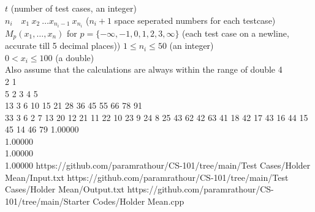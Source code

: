 \begin{testcasesMore}
	{$t$ \hfill(number of test cases, an integer)\\
	$n_i\quad x_1\ x_2\ \ldots x_{n_i-1}\ x_{n_i}$ \hfill($n_i+1$ space seperated numbers for each testcase)}
	{$M_{p}(x_{1},\dots ,x_{n})$ for $p=\{-\infty, -1, 0, 1, 2, 3, \infty\}$ \hfill{(each test case on a newline, accurate till 5 decimal places))}}
	{$1 \leq n_i \leq 50$ \hfill{(an integer)}\\
	$0 < x_i \leq 100$ \hfill{(a double)}\\
	Also assume that the calculations are always within the range of double}
	{4\\2 1\\5 2 3 4 5\\13 3 6 10 15 21 28 36 45 55 66 78 91\\33 3 6 2 7 13 20 12 21 11 22 10 23 9 24 8 25 43 62 42 63 41 18 42 17 43 16 44 15 45 14 46 79}
	{1.00000\\1.00000\\1.00000\\1.00000}
	{https://github.com/paramrathour/CS-101/tree/main/Test Cases/Holder Mean/Input.txt}
	{https://github.com/paramrathour/CS-101/tree/main/Test Cases/Holder Mean/Output.txt}
	{https://github.com/paramrathour/CS-101/tree/main/Starter Codes/Holder Mean.cpp}
\end{testcasesMore}
